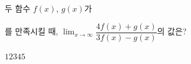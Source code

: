 두 함수 $f(x)$, $g(x)$가 \par\smallskip{}\par\smallskip\noindent 를 만족시킬 때, $\displaystyle\lim_{x\to\infty} \dfrac{4f(x)+g(x)}{3f(x)-g(x)}$의 값은?
\begin{choices32}{$1$}{$2$}{$3$}{$4$}{$5$}\end{choices32}
